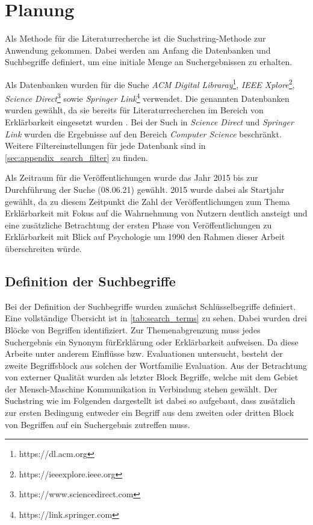 \section{Planung}

Als Methode für die Literaturrecherche ist die Suchstring-Methode zur Anwendung gekommen. Dabei werden am Anfang die Datenbanken und Suchbegriffe definiert, um eine initiale Menge an Suchergebnissen zu erhalten.

Als Datenbanken wurden für die Suche \textit{ACM Digital Libraray}\footnote{https://dl.acm.org}, \textit{IEEE Xplore}\footnote{https://ieeexplore.ieee.org}, \textit{Science Direct}\footnote{https://www.sciencedirect.com} sowie \textit{Springer Link}\footnote{https://link.springer.com} verwendet. Die genannten Datenbanken wurden gewählt, da sie bereits für Literaturrecherchen im Bereich von Erklärbarkeit eingesetzt wurden \cite{nunes_systematic_2017, carvalho2017quality}. Bei der Such in \textit{Science Direct} und \textit{Springer Link} wurden die Ergebnisse auf den Bereich \textit{Computer Science} beschränkt. Weitere Filtereinstellungen für jede Datenbank sind in \autoref{sec:appendix_search_filter} zu finden.

Als Zeitraum für die Veröffentlichungen wurde das Jahr 2015 bis zur Durchführung der Suche (08.06.21) gewählt. 2015 wurde dabei als Startjahr gewählt, da zu diesem Zeitpunkt die Zahl der Veröffentlichungen zum Thema Erklärbarkeit mit Fokus auf die Wahrnehmung von Nutzern deutlich ansteigt und eine zusätzliche Betrachtung der ersten Phase von Veröffentlichungen zu Erklärbarkeit mit Blick auf Psychologie um 1990 den Rahmen dieser Arbeit überschreiten würde.

\subsection{Definition der Suchbegriffe}

Bei der Definition der Suchbegriffe wurden zunächst Schlüsselbegriffe definiert. Eine vollständige Übersicht ist in \autoref{tab:search_terms} zu sehen. Dabei wurden drei Blöcke von Begriffen identifiziert. Zur Themenabgrenzung muss jedes Suchergebnis ein Synonym für\glqq Erklärung\grqq{} oder \glqq Erklärbarkeit\grqq{} aufweisen. Da diese Arbeite unter anderem Einflüsse bzw. Evaluationen untersucht, besteht der zweite Begriffsblock aus solchen der Wortfamilie \glqq Evaluation\grqq{}. Aus der Betrachtung von externer Qualität wurden als letzter Block Begriffe, welche mit dem Gebiet der Mensch-Maschine Kommunikation in Verbindung stehen gewählt. Der Suchstring wie im Folgenden dargestellt ist dabei so aufgebaut, dass zusätzlich zur ersten Bedingung entweder ein Begriff aus dem zweiten oder dritten Block von Begriffen auf ein Suchergebnis zutreffen muss.

